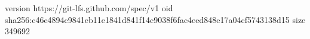 version https://git-lfs.github.com/spec/v1
oid sha256:c46e4894c9841eb11e1841d841f14c9038f6fac4eed848e17a04cf5743138d15
size 349692
